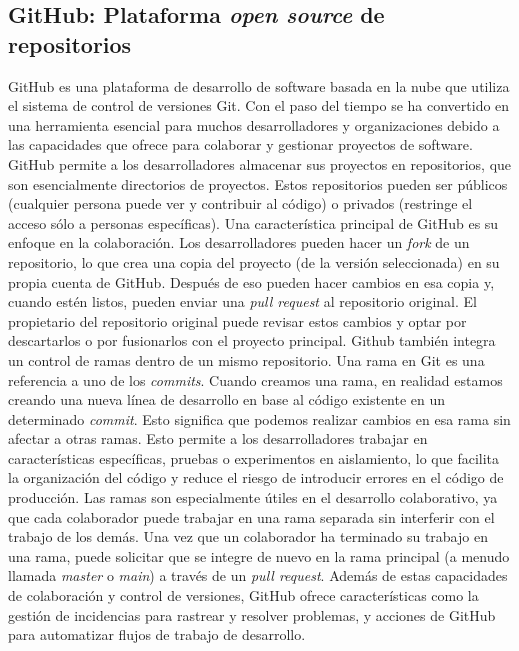     \subsection{GitHub: Plataforma \textit{open source} de repositorios}
    GitHub \cite{wiki:github} es una plataforma de desarrollo de software basada en la nube que utiliza el sistema de control de versiones Git. Con el paso del tiempo se ha convertido en una herramienta esencial para muchos desarrolladores y organizaciones debido a las capacidades que ofrece para colaborar y gestionar proyectos de software.
    GitHub permite a los desarrolladores almacenar sus proyectos en repositorios, que son esencialmente directorios de proyectos. Estos repositorios pueden ser públicos (cualquier persona puede ver y contribuir al código) o privados (restringe el acceso sólo a personas específicas).
    Una característica principal de GitHub es su enfoque en la colaboración. Los desarrolladores pueden hacer un \textit{fork} de un repositorio, lo que crea una copia del proyecto (de la versión seleccionada) en su propia cuenta de GitHub. Después de eso pueden hacer cambios en esa copia y, cuando estén listos, pueden enviar una \textit{pull request} al repositorio original. El propietario del repositorio original puede revisar estos cambios y optar por descartarlos o por fusionarlos con el proyecto principal.
    Github también integra un control de ramas dentro de un mismo repositorio. Una rama en Git es una referencia a uno de los \textit{commits}. Cuando creamos una rama, en realidad estamos creando una nueva línea de desarrollo en base al código existente en un determinado \textit{commit}. Esto significa que podemos realizar cambios en esa rama sin afectar a otras ramas. Esto permite a los desarrolladores trabajar en características específicas, pruebas o experimentos en aislamiento, lo que facilita la organización del código y reduce el riesgo de introducir errores en el código de producción.
    Las ramas son especialmente útiles en el desarrollo colaborativo, ya que cada colaborador puede trabajar en una rama separada sin interferir con el trabajo de los demás. Una vez que un colaborador ha terminado su trabajo en una rama, puede solicitar que se integre de nuevo en la rama principal (a menudo llamada \textit{master} o \textit{main}) a través de un \textit{pull request}.     
    Además de estas capacidades de colaboración y control de versiones, GitHub ofrece características como la gestión de incidencias para rastrear y resolver problemas, y acciones de GitHub para automatizar flujos de trabajo de desarrollo.
